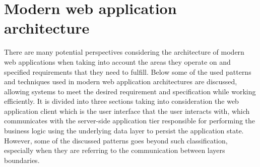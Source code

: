 



\section{Modern web application architecture}

There are many potential perspectives considering the architecture of modern web applications when taking into account the areas they operate on and specified requirements that they need to fulfill. Below some of the used patterns and techniques used in modern web application architectures are discussed, allowing systems to meet the desired requirement and specification while working efficiently. It is divided into three sections taking into consideration the web application client which is the user interface that the user interacts with, which communicates with the server-side application tier responsible for performing the business logic using the underlying data layer to persist the application state. However, some of the discussed patterns goes beyond such classification, especially when they are referring to the communication between layers boundaries.

